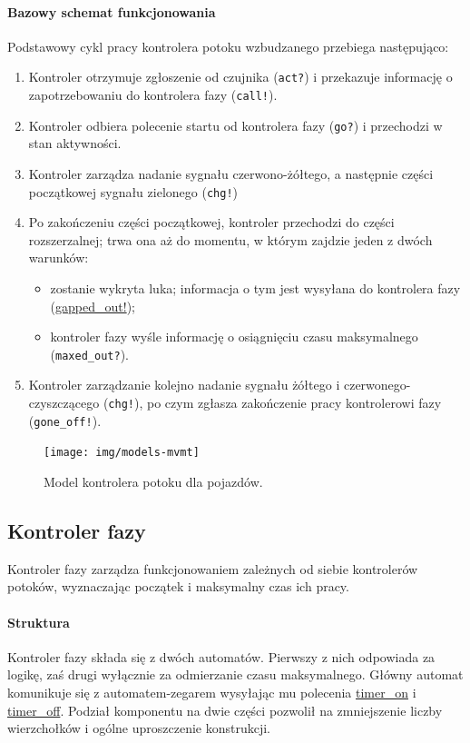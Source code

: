\documentclass{pracamgr}
\theoremstyle{plain}
\begin{document}
\paragraph{Bazowy schemat funkcjonowania} Podstawowy cykl pracy
kontrolera potoku wzbudzanego przebiega następująco:
\begin{enumerate}
  \item Kontroler otrzymuje zgłoszenie od czujnika (\texttt{act?}) i przekazuje
  informację o zapotrzebowaniu do kontrolera fazy (\texttt{call!}).
  \item Kontroler odbiera polecenie startu od kontrolera fazy
  (\texttt{go?}) i przechodzi w stan aktywności.
  \item Kontroler zarządza nadanie sygnału czerwono-żółtego, a
  następnie części początkowej sygnału zielonego (\texttt{chg!})
  \item Po zakończeniu części początkowej, kontroler przechodzi do
  części rozszerzalnej; trwa ona aż do momentu, w którym zajdzie jeden
  z dwóch warunków:
  \begin{itemize}
    \item zostanie wykryta luka; informacja o tym jest wysyłana do
    kontrolera fazy (\url{gapped_out!});
    \item kontroler fazy wyśle informację o osiągnięciu czasu
    maksymalnego (\texttt{maxed\_out?}).
  \end{itemize}
  \item Kontroler zarządzanie kolejno nadanie sygnału żółtego i
  czerwonego-czyszczącego (\texttt{chg!}), po czym zgłasza zakończenie pracy
  kontrolerowi fazy (\texttt{gone\_off!}).
\end{enumerate}
\begin{figure}
  \centering
  \texttt{[image: img/models-mvmt]}
  \caption{Model kontrolera potoku dla pojazdów.}
  \label{img:mvmt-ctrl}
\end{figure}

\subsection{Kontroler fazy}
Kontroler fazy zarządza funkcjonowaniem zależnych od siebie
kontrolerów potoków, wyznaczając początek i maksymalny czas ich pracy.

\paragraph{Struktura} Kontroler fazy składa się z dwóch
automatów. Pierwszy z nich odpowiada za logikę, zaś drugi wyłącznie za
odmierzanie czasu maksymalnego. Główny automat komunikuje się z
automatem-zegarem wysyłając mu polecenia \url{timer_on} i
\url{timer_off}. Podział komponentu na dwie części pozwolił na
zmniejszenie liczby wierzchołków i ogólne uproszczenie konstrukcji.
\end{document}

